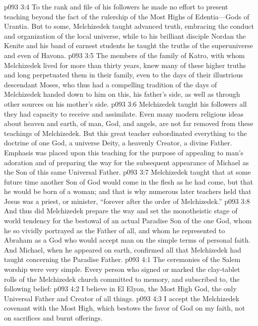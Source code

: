 \vs p093 3:4 To the rank and file of his followers he made no effort to present teaching beyond the fact of the rulership of the Most Highs of Edentia---Gods of Urantia. But to some, Melchizedek taught advanced truth, embracing the conduct and organization of the local universe, while to his brilliant disciple Nordan the Kenite and his band of earnest students he taught the truths of the superuniverse and even of Havona.
\vs p093 3:5 The members of the family of Katro, with whom Melchizedek lived for more than thirty years, knew many of these higher truths and long perpetuated them in their family, even to the days of their illustrious descendant Moses, who thus had a compelling tradition of the days of Melchizedek handed down to him on this, his father’s side, as well as through other sources on his mother’s side.
\vs p093 3:6 Melchizedek taught his followers all they had capacity to receive and assimilate. Even many modern religious ideas about heaven and earth, of man, God, and angels, are not far removed from these teachings of Melchizedek. But this great teacher subordinated everything to the doctrine of one God, a universe Deity, a heavenly Creator, a divine Father. Emphasis was placed upon this teaching for the purpose of appealing to man’s adoration and of preparing the way for the subsequent appearance of Michael as the Son of this same Universal Father.
\vs p093 3:7 Melchizedek taught that at some future time another Son of God would come in the flesh as he had come, but that he would be born of a woman; and that is why numerous later teachers held that Jesus was a priest, or minister, “forever after the order of Melchizedek.”
\vs p093 3:8 And thus did Melchizedek prepare the way and set the monotheistic stage of world tendency for the bestowal of an actual Paradise Son of the one God, whom he so vividly portrayed as the Father of all, and whom he represented to Abraham as a God who would accept man on the simple terms of personal faith. And Michael, when he appeared on earth, confirmed all that Melchizedek had taught concerning the Paradise Father.
\vs p093 4:1 The ceremonies of the Salem worship were very simple. Every person who signed or marked the clay\hyp{}tablet rolls of the Melchizedek church committed to memory, and subscribed to, the following belief:
\pc \vs p093 4:2 \bibnobreakspace I believe in El Elyon, the Most High God, the only Universal Father and Creator of all things.
\vs p093 4:3 \bibnobreakspace I accept the Melchizedek covenant with the Most High, which bestows the favor of God on my faith, not on sacrifices and burnt offerings.
